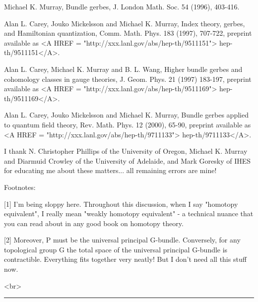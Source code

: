 Michael K. Murray, Bundle gerbes, J. London Math. Soc. 54 (1996), 403-416.

Alan L. Carey, Jouko Mickelsson and Michael K. Murray, Index theory,
gerbes, and Hamiltonian quantization, Comm. Math. Phys. 183 (1997), 707-722,
preprint available as <A HREF = "http://xxx.lanl.gov/abs/hep-th/9511151">
hep-th/9511151</A>.

Alan L. Carey, Michael K. Murray and B. L. Wang, Higher bundle gerbes and 
cohomology classes in gauge theories, J. Geom. Phys. 21 (1997) 183-197,
preprint available as <A HREF = "http://xxx.lanl.gov/abs/hep-th/9511169">
hep-th/9511169</A>.

Alan L. Carey, Jouko Mickelsson and Michael K. Murray, Bundle gerbes
applied to quantum field theory, Rev. Math. Phys. 12 (2000), 65-90,
preprint available as <A HREF = "http://xxx.lanl.gov/abs/hep-th/9711133">
hep-th/9711133</A>.

I thank N. Christopher Phillips of the University of Oregon, 
Michael K. Murray and Diarmuid Crowley of the University of 
Adelaide, and Mark Goresky of IHES for educating me about these
matters... all remaining errors are mine!

Footnotes: 

[1] 
I'm being sloppy here.  Throughout this discussion, when
I say "homotopy equivalent",
I really mean "weakly homotopy equivalent" - a technical
nuance that you can read about in any good book on homotopy theory.

[2] Moreover, P must be the universal principal G-bundle. Conversely,
for any topological group G the total space of the universal principal
G-bundle is contractible.    Everything fits together very neatly!  But
I don't need all this stuff now.




<br>
\par\noindent\rule{\textwidth}{0.4pt}

